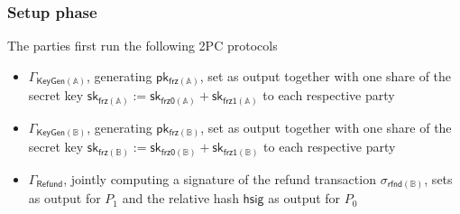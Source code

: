 \documentclass{article}      	%
\begin{document}
\subsubsection*{Setup phase}
The parties first run the following 2PC protocols 
\begin{itemize}
    \item  $\Gamma_{\mathsf{KeyGen(\mathbb{A})}}$, generating $\mathsf{pk_{frz(\mathbb{A})}}$, set as output together with one share of the secret key $\mathsf{sk_{frz(\mathbb{A})}} := \mathsf{sk_{frz0(\mathbb{A})}} + \mathsf{sk_{frz1(\mathbb{A})}}$ to each respective party 
    \item  $\Gamma_{\mathsf{KeyGen(\mathbb{B})}}$, generating $\mathsf{pk_{frz(\mathbb{B})}}$, set as output together with one share of the secret key $\mathsf{sk_{frz(\mathbb{B})}} := \mathsf{sk_{frz0(\mathbb{B})}} + \mathsf{sk_{frz1(\mathbb{B})}}$ to each respective party
    \item  $\Gamma_{\mathsf{Refund}}$, jointly computing a signature of the refund transaction $\sigma_{\mathsf{rfnd(\mathbb{B})}}$, sets as output for $P_1$ and the relative hash $\mathsf{hsig}$ as output for $P_0$
\end{itemize}
\end{document}
